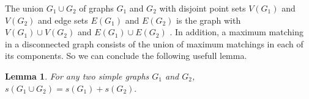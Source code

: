 \documentclass[11pt]{article}
\newtheorem{proposition}[theorem]{Proposition}
\newtheorem{lemma}[theorem]{Lemma}
\newcommand{\proof}{\noindent{\bf Proof.\ }}
\newcommand{\qed}{\hfill $\square$\medskip}
\begin{document}


 

           

\medskip
The union $G_1\cup G_2$ of graphs $G_1$ and $G_2$ with disjoint point sets $V(G_1)$ and $V(G_2)$ and edge sets $E(G_1)$ and $E(G_2)$ is the graph with $V(G_1)\cup V(G_2)$ and $E(G_1)\cup E(G_2)$ \cite{Har}. In addition, a maximum matching in a disconnected graph consists of the union of maximum matchings in each of its components. So we can 
conclude the following usefull lemma.

\begin{lemma}\label{union}
For any two simple graphs  $G_1$ and $G_2$,   $s(G_1\cup G_2)=s(G_1)+s(G_2).$
\end{lemma}
\end{document}
